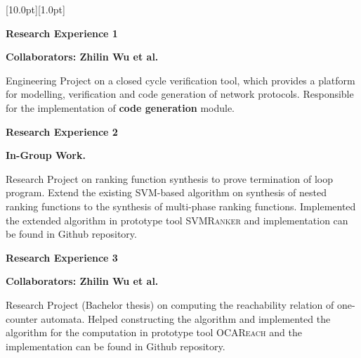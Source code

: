 \documentclass[12pt,a4paper,utf8]{report}
\begin{document}
\newpage
\begin{minipage}[t]{16cm}
    \colorbox{subtitlecolor}{\raisebox{0pt}[10.0pt][1.0pt]{
        \textcolor{white}{\textsf{}}}}
\end{minipage}\par
\vspace{0.2cm}\hspace{0.5cm}
\begin{minipage}[t]{15cm}
    {\textbf{Research Experience 1}}\par
    {\textbf{Collaborators: Zhilin Wu et al.}}\par
    \qquad\qquad\qquad\qquad\qquad\qquad{}\par
    \quad Engineering Project on a closed cycle verification tool, which provides a platform for modelling, verification and code generation of network protocols. Responsible for the implementation of \textbf{code generation} module. \par
    \vspace{0.2cm}
    {\textbf{Research Experience 2}}\par
    \textbf{In-Group Work.}\par
    \qquad\qquad\qquad\qquad\qquad\qquad{}\par
    \quad Research Project on  ranking function synthesis to prove termination of loop program. Extend the existing SVM-based algorithm on  synthesis of nested ranking functions to the synthesis of multi-phase ranking functions. Implemented the extended algorithm in prototype tool \textsc{SVMRanker} and implementation can be found in Github repository.\par
    \vspace{0.2cm}
    {\textbf{Research Experience 3}}\par
    {\textbf{Collaborators: Zhilin Wu et al.}}\par
    \qquad\qquad\qquad\qquad\qquad\qquad{}\par
    \quad Research Project (Bachelor thesis) on computing the reachability relation of one-counter automata. Helped constructing the algorithm and implemented the algorithm for the computation in prototype tool \textsc{OCAReach} and the implementation can be found in Github repository.\par
    
\end{minipage}\par
\vspace{0.4cm}
\end{document}
